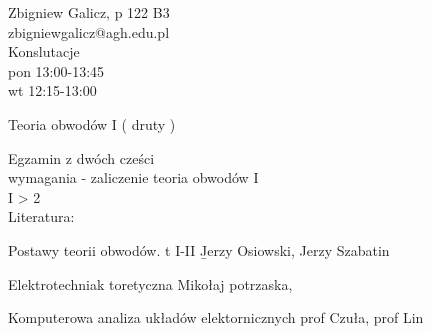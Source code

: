 \documentclass{article}
\begin{document}
Zbigniew Galicz, p 122 B3 \\
zbigniewgalicz@agh.edu.pl \\
Konslutacje
\\pon 13:00-13:45
\\wt 12:15-13:00

\bigskip
Teoria obwodów I ( druty )

Egzamin z dwóch cześci \\
wymagania - zaliczenie teoria obwodów I \\
I > 2 \\

Literatura:

Postawy teorii obwodów. t I-II \b{Jerzy Osiowski, Jerzy Szabatin}

Elektrotechniak toretyczna Mikołaj potrzaska, 

Komputerowa analiza układów elektornicznych prof Czuła, prof Lin
\end{document}
